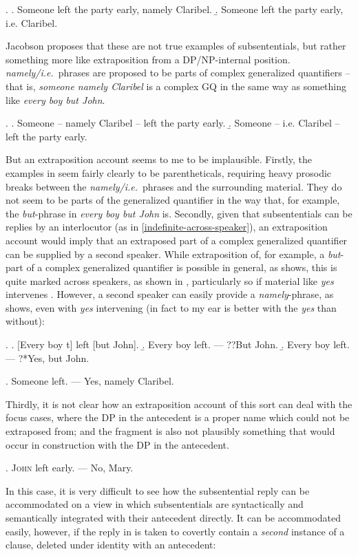 \documentclass[doublespace]{umthesis}
\begin{document}
\ex. 	\a. Someone left the party early, namely Claribel.
	\b. Someone left the party early, i.e. Claribel.

Jacobson proposes that these are not true examples of subsententials, but rather something more like extraposition from a DP/NP-internal position. {\it namely/i.e.}~phrases are proposed to be parts of complex generalized quantifiers -- that is, {\it someone namely Claribel} is a complex GQ in the same way as something like {\it every boy but John}.

\ex. 	\a. Someone -- namely Claribel -- left the party early.
	\b. Someone -- i.e. Claribel -- left the party early.

But an extraposition account seems to me to be implausible. Firstly, the examples in \Last seem fairly clearly to be parentheticals, requiring heavy prosodic breaks between the {\it namely/i.e.}~phrases and the surrounding material. They do not seem to be parts of the generalized quantifier in the way that, for example, the {\it but}-phrase in {\it every boy but John} is. Secondly, given that subsententials can be replies by an interlocutor (as in \ref{indefinite-across-speaker}), an extraposition account would imply that an extraposed part of a complex generalized quantifier can be supplied by a second speaker. While extraposition of, for example, a {\it but}-part of a complex generalized quantifier is possible in general, as \Next[a] shows, this is quite marked across speakers, as shown in \Next[b], particularly so if material like {\it yes} intervenes \Next[c]. However, a second speaker can easily provide a {\it namely}-phrase, as \NNext shows, even with {\it yes} intervening (in fact to my ear \NNext is better with the {\it yes} than without):

\ex. 	\a. [Every boy t] left [but John].
	\b. Every boy left. --- ??But John. 
	\b. Every boy left. --- ?*Yes, but John.
	
\ex. 	Someone left. --- Yes, namely Claribel.

Thirdly, it is not clear how an extraposition account of this sort can deal with the focus cases, where the DP in the antecedent is a proper name which could not be extraposed from; and the fragment is also not plausibly something that would occur in construction with the DP in the antecedent.

\ex. 	\textsc{John} left early. --- No, Mary.

In this case, it is very difficult to see how the subsentential reply can be accommodated on a view in which subsententials are syntactically and semantically integrated with their antecedent directly. It can be accommodated easily, however, if the reply in \Last is taken to covertly contain a \emph{second} instance of a clause, deleted under identity with an antecedent:
\end{document}
